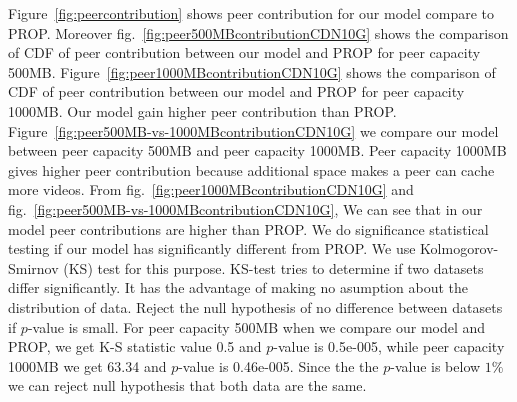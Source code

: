 \documentclass[conference]{IEEEtran}
\begin{document}
Figure~\ref{fig:peercontribution} shows peer contribution for our model compare to PROP. 
Moreover fig.~\ref{fig:peer500MBcontributionCDN10G} shows the comparison of CDF of peer contribution between our model and PROP for peer capacity 500MB. 
Figure~\ref{fig:peer1000MBcontributionCDN10G} shows the comparison of CDF of peer contribution between our model and PROP for peer capacity 1000MB.
Our model gain higher peer contribution than PROP. 
Figure~\ref{fig:peer500MB-vs-1000MBcontributionCDN10G} we compare our model between peer capacity 500MB and peer capacity 1000MB.
Peer capacity 1000MB gives higher peer contribution because additional space makes a peer can cache more videos.
From fig.~\ref{fig:peer1000MBcontributionCDN10G} and fig.~\ref{fig:peer500MB-vs-1000MBcontributionCDN10G}, We can see that in our model peer contributions are higher than PROP.
We do significance statistical testing if our model has significantly different from PROP.
We use Kolmogorov-Smirnov (KS) test for this purpose.  
KS-test tries to determine if two datasets differ significantly.  
It has the advantage of making no asumption about the distribution of data. 
Reject the null hypothesis of no difference between datasets if $p$-value is small.
For peer capacity 500MB when we compare our model and PROP, we get K-S statistic value 0.5 and $p$-value is 0.5e-005, while peer capacity 1000MB we get 63.34 and $p$-value is 0.46e-005.
Since the the $p$-value is below $1\%$ we can reject null hypothesis that both data are the same.
\end{document}
